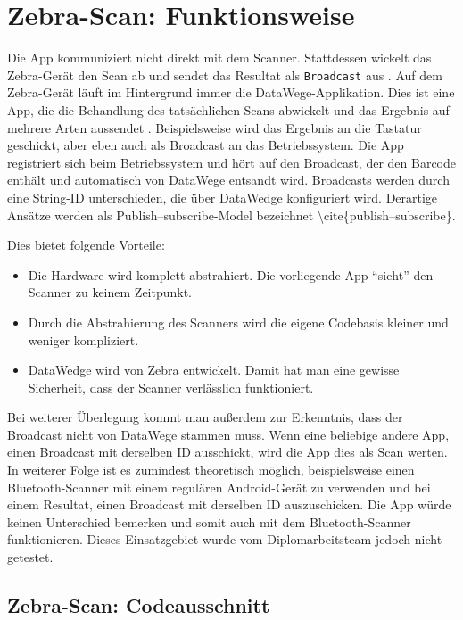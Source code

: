 \hypertarget{zebra-scan-funktionsweise}{%
\section{Zebra-Scan: Funktionsweise}\label{zebra-scan-funktionsweise}}

Die App kommuniziert nicht direkt mit dem Scanner. Stattdessen wickelt
das Zebra-Gerät den Scan ab und sendet das Resultat als
\texttt{Broadcast} aus \cite{broadcast}. Auf dem Zebra-Gerät läuft im
Hintergrund immer die DataWege-Applikation. Dies ist eine App, die die
Behandlung des tatsächlichen Scans abwickelt und das Ergebnis auf
mehrere Arten aussendet \cite{datawedge}. Beispielsweise wird das
Ergebnis an die Tastatur geschickt, aber eben auch als Broadcast an das
Betriebssystem. Die App registriert sich beim Betriebssystem und hört
auf den Broadcast, der den Barcode enthält und automatisch von DataWege
entsandt wird. Broadcasts werden durch eine String-ID unterschieden, die
über DataWedge konfiguriert wird. Derartige Ansätze werden als
Publish--subscribe-Model bezeichnet
\textbackslash cite\{publish--subscribe\}.

Dies bietet folgende Vorteile:

\begin{itemize}
\tightlist
\item
  Die Hardware wird komplett abstrahiert. Die vorliegende App ``sieht''
  den Scanner zu keinem Zeitpunkt.
\item
  Durch die Abstrahierung des Scanners wird die eigene Codebasis kleiner
  und weniger kompliziert.
\item
  DataWedge wird von Zebra entwickelt. Damit hat man eine gewisse
  Sicherheit, dass der Scanner verlässlich funktioniert.
\end{itemize}

Bei weiterer Überlegung kommt man außerdem zur Erkenntnis, dass der
Broadcast nicht von DataWege stammen muss. Wenn eine beliebige andere
App, einen Broadcast mit derselben ID ausschickt, wird die App dies als
Scan werten. In weiterer Folge ist es zumindest theoretisch möglich,
beispielsweise einen Bluetooth-Scanner mit einem regulären Android-Gerät
zu verwenden und bei einem Resultat, einen Broadcast mit derselben ID
auszuschicken. Die App würde keinen Unterschied bemerken und somit auch
mit dem Bluetooth-Scanner funktionieren. Dieses Einsatzgebiet wurde vom
Diplomarbeitsteam jedoch nicht getestet.

\hypertarget{zebra-scan-codeausschnitt}{%
\subsection{Zebra-Scan:
Codeausschnitt}\label{zebra-scan-codeausschnitt}}

